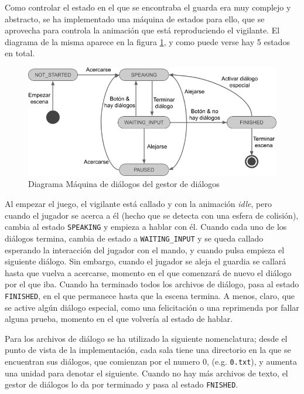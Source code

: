 Como controlar el estado en el que se encontraba el guarda era muy complejo y abstracto, se ha implementado una máquina de estados para ello, que se aprovecha para controla la animación que está reproduciendo el vigilante. El diagrama de la misma aparece en la figura \ref{fig:dialogs-state-machine}, y como puede verse hay 5 estados en total.

\begin{figure}[!h]
\vspace{0.5cm}
\begin{center}
\includegraphics[width=1\textwidth]{imagenes/7/maquina-estados-dialogos.png}
\caption{Diagrama Máquina de diálogos del gestor de diálogos}
\label{fig:dialogs-state-machine}
\end{center}
\end{figure}

Al empezar el juego, el vigilante está callado y con la animación \textit{idle}, pero cuando el jugador se acerca a él (hecho que se detecta con una esfera de colisión), cambia al estado \texttt{SPEAKING} y empieza a hablar con él. Cuando cada uno de los diálogos termina, cambia de estado a \texttt{WAITING\_INPUT} y se queda callado esperando la interacción del jugador con el mando, y cuando pulsa empieza el siguiente diálogo. Sin embargo, cuando el jugador se aleja el guardia se callará hasta que vuelva a acercarse, momento en el que comenzará de nuevo el diálogo por el que iba. Cuando ha terminado todos los archivos de diálogo, pasa al estado \texttt{FINISHED}, en el que permanece hasta que la escena termina. A menos, claro, que se active algún diálogo especial, como una felicitación o una reprimenda por fallar alguna prueba, momento en el que volvería al estado de hablar.

Para los archivos de diálogo se ha utilizado la siguiente nomenclatura; desde el punto de vista de la implementación, cada sala tiene una directorio en la que se encuentran sus diálogos, que comienzan por el numero 0, (e.g. \texttt{0.txt}), y aumenta una unidad para denotar el siguiente. Cuando no hay más archivos de texto, el gestor de diálogos lo da por terminado y pasa al estado \texttt{FNISHED}.

